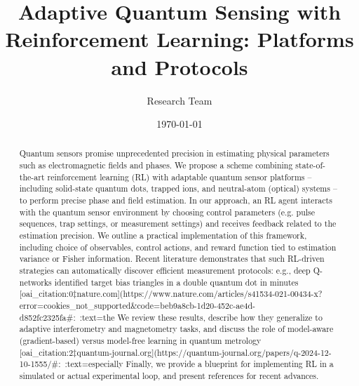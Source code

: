 \documentclass[12pt]{article}
\begin{document}
\title{Adaptive Quantum Sensing with Reinforcement Learning: Platforms and Protocols}
\author{Research Team}
\date{\today}
\maketitle

\begin{abstract}
  Quantum sensors promise unprecedented precision in estimating physical parameters such as electromagnetic fields and phases.  We propose a scheme combining state-of-the-art reinforcement learning (RL) with adaptable quantum sensor platforms -- including solid-state quantum dots, trapped ions, and neutral-atom (optical) systems -- to perform precise phase and field estimation.  In our approach, an RL agent interacts with the quantum sensor environment by choosing control parameters (e.g. pulse sequences, trap settings, or measurement settings) and receives feedback related to the estimation precision.  We outline a practical implementation of this framework, including choice of observables, control actions, and reward function tied to estimation variance or Fisher information.  Recent literature demonstrates that such RL-driven strategies can automatically discover efficient measurement protocols: e.g., deep Q-networks identified target bias triangles in a double quantum dot in minutes
[oai_citation:0‡nature.com](https://www.nature.com/articles/s41534-021-00434-x?error=cookies_not_supported&code=beb9a8cb-1d20-452c-ae4d-d852fc2325fa#:~:text=the%
  We review these results, describe how they generalize to adaptive interferometry and magnetometry tasks, and discuss the role of model-aware (gradient-based) versus model-free learning in quantum metrology [oai_citation:2‡quantum-journal.org](https://quantum-journal.org/papers/q-2024-12-10-1555/#:~:text=especially%
Finally, we provide a blueprint for implementing RL in a simulated or actual experimental loop, and present references for recent advances. 
\end{abstract}
\end{document}
